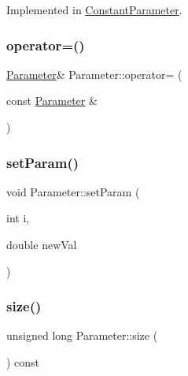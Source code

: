 Implemented in \hyperlink{class_constant_parameter_a23abb141692843e2ef68d43f610beb5e}{Constant\+Parameter}.

\hypertarget{class_parameter_ac7e34f069ed1474901fce2f06e0ee54f}{}\label{class_parameter_ac7e34f069ed1474901fce2f06e0ee54f} 
\subsubsection{\texorpdfstring{operator=()}{operator=()}}
{\footnotesize\ttfamily \hyperlink{class_parameter}{Parameter}\& Parameter\+::operator= (\begin{DoxyParamCaption}\item[{const \hyperlink{class_parameter}{Parameter} \&}]{ }\end{DoxyParamCaption})\hspace{0.3cm}{\ttfamily [default]}}

\hypertarget{class_parameter_a8cebb26e89537b098c8b42ef9aeb0f66}{}\label{class_parameter_a8cebb26e89537b098c8b42ef9aeb0f66} 
\subsubsection{\texorpdfstring{set\+Param()}{setParam()}}
{\footnotesize\ttfamily void Parameter\+::set\+Param (\begin{DoxyParamCaption}\item[{int}]{i,  }\item[{double}]{new\+Val }\end{DoxyParamCaption})\hspace{0.3cm}{\ttfamily [inline]}}

\hypertarget{class_parameter_ae1ca6e3ab5f2d2ed3bffbdee6e941068}{}\label{class_parameter_ae1ca6e3ab5f2d2ed3bffbdee6e941068} 
\subsubsection{\texorpdfstring{size()}{size()}}
{\footnotesize\ttfamily unsigned long Parameter\+::size (\begin{DoxyParamCaption}{ }\end{DoxyParamCaption}) const\hspace{0.3cm}{\ttfamily [inline]}}



